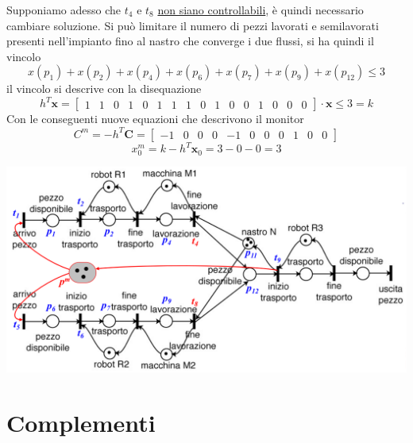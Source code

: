 \documentclass[10pt, letterpaper]{report}
\begin{document}
Supponiamo adesso che $t_4$ e $t_8$ \underline{non siano controllabili}, è quindi necessario cambiare soluzione. Si può limitare il numero di pezzi lavorati e semilavorati presenti nell'impianto fino al nastro che converge i due flussi, si ha quindi il vincolo 
$$ x(p_1)+x(p_2)+x(p_4)+x(p_6)+x(p_7)+x(p_9)+x(p_12)\le 3$$
il vincolo si descrive con la disequazione$$h^{T} \mathbf{x} = \begin{bmatrix}
    1 & 1 & 0 & 1 & 0 & 1 & 1 & 1 & 0 & 1 & 0 & 0 & 1 & 0 & 0 & 0
    \end{bmatrix} \cdot \mathbf{x} \leq 3 = k $$
Con le conseguenti nuove equazioni che descrivono il monitor$$ C^{m} = -h^{T}\mathbf C = \begin{bmatrix}
    -1 & 0 & 0 & 0 & -1 & 0 & 0 & 0 & 1 & 0 & 0
    \end{bmatrix}
   $$ $$ 
    x_{0}^{m} = k - h^{T}\mathbf x_{0} = 3 - 0 - 0 = 3$$
    \begin{center}
        \includegraphics[width=\textwidth]{images/transUC2.png}
    \end{center}















\chapter{Complementi}
\end{document}
